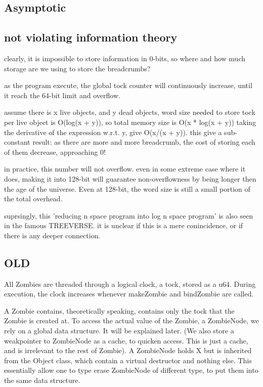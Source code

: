 \subsection{Asymptotic}
\subsection{not violating information theory}
clearly, it is impossible to store information in 0-bits, so where and how much storage are we using to store the breadcrumbs?

as the program execute, the global tock counter will continuously increase, until it reach the 64-bit limit and overflow.

assume there is x live objects, and y dead objects, word size needed to store tock per live object is O(log(x + y)), so total memory size is O(x * log(x + y)) taking the derivative of the expression w.r.t. y, give O(x/(x + y)). this give a sub-constant result: as there are more and more breadcrumb, the cost of storing each of them decrease, approaching 0!

in practice, this number will not overflow. even in some extreme case where it does, making it into 128-bit will guarantee non-overflowness by being longer then the age of the universe. Even at 128-bit, the word size is still a small portion of the total overhead.

suprsingly, this 'reducing n space program into log n space program' is also seen in the famous TREEVERSE. it is unclear if this is a mere conincidence, or if there is any deeper connection.
\subsection{OLD}
All Zombies are threaded through a logical clock, a tock, stored as a u64.
During execution, the clock increases whenever makeZombie and bindZombie are called.

A Zombie contains, theoretically speaking, contains only the tock that the Zombie is created at.
To access the actual value of the Zombie, a ZombieNode, we rely on a global data structure.
It will be explained later.
(We also store a weakpointer to ZombieNode as a cache, to quicken access. This is just a cache, and is irrelevant to the rest of Zombie).
A ZombieNode holds X but is inherited from the Object class, which contain a virtual destructor and nothing else. This essentially allow one to type erase ZombieNode of different type, to put them into the same data structure.

